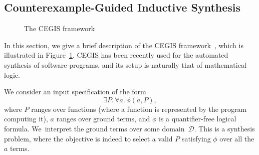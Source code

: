 \documentclass[twocolumn]{autart}    %
\begin{document}
\subsection{Counterexample-Guided Inductive Synthesis} 
\label{ssec:cegis}

\begin{figure}
\centering
{}
 \caption{The CEGIS framework\label{fig:CEGIS}}
\end{figure}

In this section, we give a brief description of the CEGIS framework~\cite{jha-icse10,
  DBLP:conf/asplos/Solar-LezamaTBSS06}, which is illustrated in Figure~\ref{fig:CEGIS}. 
  CEGIS has been recently used for the automated synthesis of software programs, 
  and its setup is naturally that of mathematical logic. 

We consider an input specification of the form 
$$
\exists P .\, \forall a.\, \phi(a, P),
$$  
where $P$ ranges over functions (where a function is represented by the program computing it),
$a$ ranges over ground terms, 
and $\phi$ is a quantifier-free logical formula. 
We~interpret the ground terms over some domain~$\mathcal{D}$. 
This is a synthesis problem, where the objective is indeed to select a valid $P$ satisfying $\phi$ over all the $a$ terms. 
\end{document}
